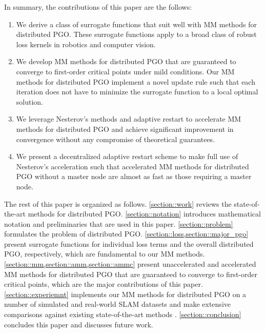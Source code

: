 In summary, the contributions of this paper are the follows:
\begin{enumerate}
\item We derive a class of surrogate functions that suit well with MM methods for distributed PGO. These surrogate functions apply to a broad class of robust loss kernels in robotics and computer vision.
\item We develop MM methods for distributed PGO that are guaranteed to converge to first-order critical points under mild conditions. Our MM methods for distributed PGO  implement a novel update rule such that each iteration does not have to minimize the surrogate function to a local optimal solution.
\item We leverage Nesterov's methods and adaptive restart to accelerate MM methods for distributed PGO and achieve significant improvement in convergence without any compromise of theoretical guarantees.
\item We present a decentralized adaptive restart scheme to make full use of Nesterov's acceleration such that accelerated MM methods for distributed PGO without a master node are almost as fast as those requiring a master node.
\end{enumerate}

The rest of this paper is organized as follows. \cref{section::work} reviews the state-of-the-art methods for distributed PGO. \cref{section::notation} introduces mathematical notation and preliminaries that are used in this paper. \cref{section::problem} formulates the problem of distributed PGO. \cref{section::loss,section::major_pgo} present surrogate functions for individual loss terms and the overall distributed PGO, respectively, which are fundamental to our MM methods. \cref{section::mm,section::amm,section::ammc} present unaccelerated and accelerated MM methods for distributed PGO that are guaranteed to converge to first-order critical points, which are the major contributions of this paper. \cref{section::experiemnt} implements our MM methods for distributed PGO on a number of simulated and real-world SLAM datasets and make extensive comparisons against existing state-of-the-art methods \cite{choudhary2017distributed,tian2019distributed}. \cref{section::conclusion} concludes this paper and discusses future work.